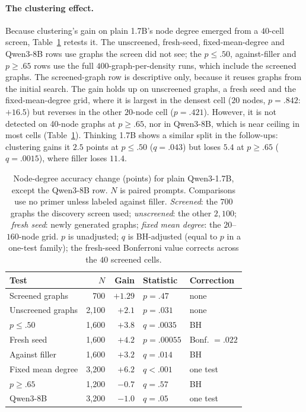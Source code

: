 \documentclass[11pt]{article}
\begin{document}
\paragraph{The clustering effect.} Because clustering's gain on plain 1.7B's node degree emerged from a $40$-cell screen, Table~\ref{tab:clust} retests it. The unscreened, fresh-seed, fixed-mean-degree and Qwen3-8B rows use graphs the screen did not see; the $p\leq.50$, against-filler and $p\geq.65$ rows use the full $400$-graph-per-density runs, which include the screened graphs. The screened-graph row is descriptive only, because it reuses graphs from the initial search. %
The gain holds up on unscreened graphs, a fresh seed and the fixed-mean-degree grid, where it is largest in the densest cell ($20$ nodes, $p=.842$: $+16.5$) but reverses in the other $20$-node cell ($p=.421$). However, it is not detected on 40-node graphs at $p\geq.65$, nor in Qwen3-8B, which is near ceiling in most cells (Table~\ref{tab:clust}). %
Thinking 1.7B shows a similar split in the follow-ups: clustering gains it $2.5$ points at $p\leq.50$ ($q=.043$) but loses $5.4$ at $p\geq.65$ ($q=.0015$), where filler loses $11.4$. %
\begin{table}[H]
\centering\scriptsize\setlength{\tabcolsep}{3.8pt}
\begin{tabular}{lrrll}
\toprule
Test & $N$ & Gain & Statistic & Correction\\
\midrule
Screened graphs & 700 & $+1.29$ & $p=.47$ & none\\ %
Unscreened graphs & 2,100 & $+2.1$ & $p=.031$ & none\\ %
$p\leq.50$ & 1,600 & $+3.8$ & $q=.0035$ & BH\\ %
Fresh seed & 1,600 & $+4.2$ & $p=.00055$ & Bonf. $=.022$\\ %
Against filler & 1,600 & $+3.2$ & $q=.014$ & BH\\ %
Fixed mean degree & 3,200 & $+6.2$ & $q<.001$ & one test\\ %
$p\geq.65$ & 1,200 & $-0.7$ & $q=.57$ & BH\\ %
Qwen3-8B & 3,200 & $-1.0$ & $q=.05$ & one test\\ %
\bottomrule
\end{tabular}
\caption{Node-degree accuracy change (points) for plain Qwen3-1.7B, except the Qwen3-8B row. $N$ is paired prompts. Comparisons use no primer unless labeled against filler. \emph{Screened}: the $700$ graphs the discovery screen used; \emph{unscreened}: the other $2{,}100$; \emph{fresh seed}: newly generated graphs; \emph{fixed mean degree}: the $20$--$160$-node grid. $p$ is unadjusted; $q$ is BH-adjusted (equal to $p$ in a one-test family); the fresh-seed Bonferroni value corrects across the $40$ screened cells.} %
\label{tab:clust}
\end{table}
\end{document}
